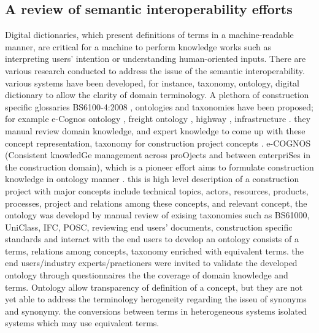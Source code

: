 \documentclass[Journal, BackFigs, DoubleSpace]{ascelike} %
\begin{document}
\subsection{A review of semantic interoperability efforts}
Digital dictionaries, which present definitions of terms in a machine-readable manner, are critical for a machine to perform knowledge works such as interpreting users' intention or understanding human-oriented inputs. There are various research conducted to address the issue of the semantic interoperability. various systems have been developed, for instance, taxonomy, ontology, digital dictionary to allow the clarity of domain terminology.
A plethora of construction specific glossaries BS6100-4:2008 \cite{bs6100-08}, ontologies and taxonomies have been proposed; for example e-Cognos ontology \cite{wetherill02}, freight ontology \cite{seedah15}, highway \cite{el-diraby05}, infrastructure \cite{osman06}. they manual review domain knowledge, and expert knowledge to come up with these concept representation, taxonomy for construction project concepts \cite{el-diraby05b}. e-COGNOS (Consistent knowledGe management across proOjects and between enterpriSes in the construction domain), which is a pioneer effort aims to formulate construction knowledge in ontology manner \cite{lima05}. this is high level description of a construction project with major concepts include technical topics, actors, resources, products, processes, project and relations among these concepts, and relevant concept,  the ontology was developd by manual review of exising taxonomies such as BS61000, UniClass, IFC, POSC, reviewing end users' documents, construction specific standards and interact with the end users to develop an ontology consists of a terms, relations among concepts, taxonomy enriched with equivalent terms. the end users/industry experts/practioners were invited to validate the developed ontology through questionnaires the the coverage of domain knowledge and terms. 
Ontology allow transparency of definition of a concept, but they are not yet able to address the terminology herogeneity regarding the isseu of synonyms and synonymy. the conversions between terms in heterogeneous systems isolated systems which may use equivalent terms. 
\end{document}
